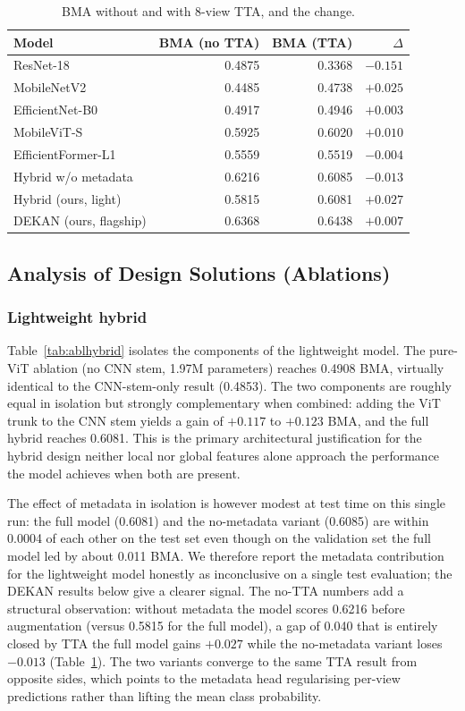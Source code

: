 \begin{table}[!t]
\centering
\caption{BMA without and with 8-view TTA, and the change.}
\label{tab:tta}
\begin{tabular}{lrrr}
\toprule
Model & BMA (no TTA) & BMA (TTA) & $\Delta$ \\
\midrule
ResNet-18            & 0.4875 & 0.3368 & $-0.151$ \\
MobileNetV2          & 0.4485 & 0.4738 & $+0.025$ \\
EfficientNet-B0      & 0.4917 & 0.4946 & $+0.003$ \\
MobileViT-S          & 0.5925 & 0.6020 & $+0.010$ \\
EfficientFormer-L1   & 0.5559 & 0.5519 & $-0.004$ \\
\midrule
Hybrid w/o metadata  & 0.6216 & 0.6085 & $-0.013$ \\
Hybrid (ours, light) & 0.5815 & 0.6081 & $+0.027$ \\
DEKAN (ours, flagship) & 0.6368 & 0.6438 & $+0.007$ \\
\bottomrule
\end{tabular}
\end{table}

\subsection{Analysis of Design Solutions (Ablations)}
\label{subsec:ablation-study}

\subsubsection{Lightweight hybrid}

Table~\ref{tab:ablhybrid} isolates the components of
the lightweight model. The pure-ViT ablation (no CNN stem, 1.97M parameters)
reaches 0.4908 BMA, virtually identical to the CNN-stem-only result (0.4853). The
two components are roughly equal in isolation but strongly complementary when
combined: adding the ViT trunk to the CNN stem yields a gain of $+0.117$ to
$+0.123$ BMA, and the full hybrid reaches 0.6081. This is the primary
architectural justification for the hybrid design neither local nor global
features alone approach the performance the model achieves when both are present.

The effect of metadata in isolation is however modest at test time on this
single run: the full model (0.6081) and the no-metadata variant (0.6085) are
within 0.0004 of each other on the test set even though on the validation set
the full model led by about 0.011 BMA. We therefore report the metadata
contribution for the lightweight model honestly as inconclusive on a single test
evaluation; the DEKAN results below give a clearer signal. The no-TTA numbers add
a structural observation: without metadata the model scores 0.6216 before
augmentation (versus 0.5815 for the full model), a gap of 0.040 that is entirely
closed by TTA the full model gains $+0.027$ while the no-metadata variant
loses $-0.013$ (Table~\ref{tab:tta}). The two variants converge to the same TTA
result from opposite sides, which points to the metadata head regularising
per-view predictions rather than lifting the mean class probability.

